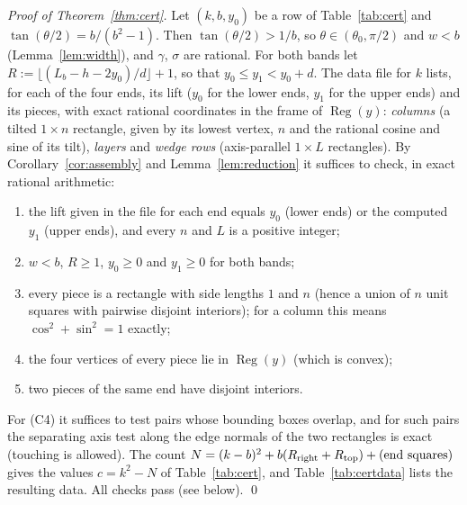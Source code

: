 \documentclass[11pt]{amsart}
\newcommand{\Reg}{\operatorname{Reg}}
\theoremstyle{definition}
\theoremstyle{remark}
\numberwithin{equation}{section}
\begin{document}
\emph{Proof of Theorem~\ref{thm:cert}.} Let $(k,b,y_0)$ be a row of Table~\ref{tab:cert} and $\tan(\theta/2)=b/(b^2-1)$.
Then $\tan(\theta/2)>1/b$, so $\theta\in(\theta_0,\pi/2)$ and $w<b$ (Lemma~\ref{lem:width}), and $\gamma$, $\sigma$
are rational. For both bands let $R:=\lfloor(L_b-h-2y_0)/d\rfloor+1$, so that $y_0\le y_1<y_0+d$. The data file for $k$
lists, for each of the four ends, its lift ($y_0$ for the lower ends, $y_1$ for the upper ends) and its pieces, with
exact rational coordinates in the frame of $\Reg(y)$: \emph{columns} (a tilted $1\times n$ rectangle, given by its
lowest vertex, $n$ and the rational cosine and sine of its tilt), \emph{layers} and \emph{wedge rows} (axis-parallel
$1\times L$ rectangles). By Corollary~\ref{cor:assembly} and Lemma~\ref{lem:reduction} it suffices to check, in exact
rational arithmetic:
\begin{enumerate}[label=(C\arabic*),start=0]
\item the lift given in the file for each end equals $y_0$ (lower ends) or the computed $y_1$ (upper ends), and every
$n$ and $L$ is a positive integer;
\item $w<b$, $R\ge1$, $y_0\ge0$ and $y_1\ge0$ for both bands;
\item every piece is a rectangle with side lengths $1$ and $n$ (hence a union of $n$ unit squares with pairwise
disjoint interiors); for a column this means $\cos^2+\sin^2=1$ exactly;
\item the four vertices of every piece lie in $\Reg(y)$ (which is convex);
\item two pieces of the same end have disjoint interiors.
\end{enumerate}
For (C4) it suffices to test pairs whose bounding boxes overlap, and for such pairs the separating axis test along the
edge normals of the two rectangles is exact (touching is allowed). The count
$N=(k-b)^2+b(R_{\rm right}+R_{\rm top})+(\text{end squares})$ gives the values $c=k^2-N$ of Table~\ref{tab:cert}, and
Table~\ref{tab:certdata} lists the resulting data. All checks pass (see below). \qed
\end{document}

